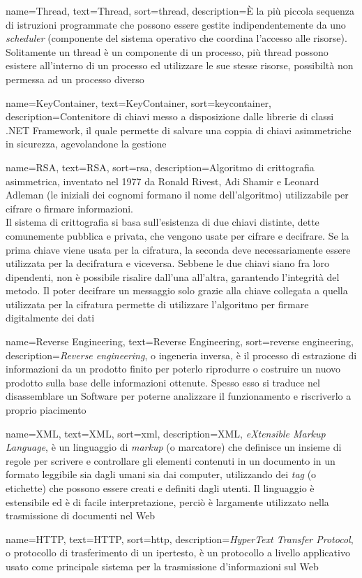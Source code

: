 {
	name={Thread},
	text={Thread},
	sort={thread},
	description={È la più piccola sequenza di istruzioni programmate che possono essere gestite indipendentemente da uno \textit{scheduler} (componente del sistema operativo che coordina l'accesso alle risorse). Solitamente un thread è un componente di un processo, più thread possono esistere all'interno di un processo ed utilizzare le sue stesse risorse, possibiltà non permessa ad un processo diverso}
}

{
	name={KeyContainer},
	text={KeyContainer},
	sort=keycontainer,
	description={Contenitore di chiavi messo a disposizione dalle librerie di classi .NET Framework, il quale permette di salvare una coppia di chiavi asimmetriche in sicurezza, agevolandone la gestione}
}

{
	name={RSA},
	text={RSA},
	sort={rsa},
	description={Algoritmo di crittografia asimmetrica, inventato nel 1977 da Ronald Rivest, Adi Shamir e Leonard Adleman (le iniziali dei cognomi formano il nome dell'algoritmo) utilizzabile per cifrare o firmare informazioni.\\
Il sistema di crittografia si basa sull'esistenza di due chiavi distinte, dette comunemente pubblica e privata, che vengono usate per cifrare e decifrare. Se la prima chiave viene usata per la cifratura, la seconda deve necessariamente essere utilizzata per la decifratura e viceversa. Sebbene le due chiavi siano fra loro dipendenti, non è possibile risalire dall'una all'altra, garantendo l'integrità del metodo. Il poter decifrare un messaggio solo grazie alla chiave collegata a quella utilizzata per la cifratura permette di utilizzare l'algoritmo per firmare digitalmente dei dati}
}

{
	name={Reverse Engineering},
	text={Reverse Engineering},
	sort={reverse engineering},
	description={\textit{Reverse engineering}, o ingeneria inversa, è il processo di estrazione di informazioni da un prodotto finito per poterlo riprodurre o costruire un nuovo prodotto sulla base delle informazioni ottenute. Spesso esso si traduce nel disassemblare un Software per poterne analizzare il funzionamento e riscriverlo a proprio piacimento}
}

{
	name={XML},
	text={XML},
	sort={xml},
	description={XML, \textit{eXtensible Markup Language}, è un linguaggio di \textit{markup} (o marcatore) che definisce un insieme di regole per scrivere e controllare gli elementi contenuti in un documento in un formato leggibile sia dagli umani sia dai computer, utilizzando dei \textit{tag} (o etichette) che possono essere creati e definiti dagli utenti. Il linguaggio è estensibile ed è di facile interpretazione, perciò è largamente utilizzato nella trasmissione di documenti nel Web}
}

{
	name={HTTP},
	text={HTTP},
	sort={http},
	description={\textit{HyperText Transfer Protocol}, o protocollo di trasferimento di un ipertesto, è un protocollo a livello applicativo usato come principale sistema per la trasmissione d'informazioni sul Web}
}